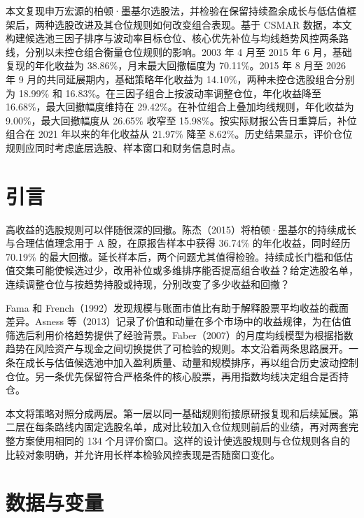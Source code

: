 \begin{cnabstract}
本文复现申万宏源的柏顿·墨基尔选股法，并检验在保留持续盈余成长与低估值框架后，两种选股改进及其仓位规则如何改变组合表现。基于 CSMAR 数据，本文构建候选池三因子排序与波动率目标仓位、核心优先补位与均线趋势风控两条路线，分别以未控仓组合衡量仓位规则的影响。2003 年 4 月至 2015 年 6 月，基础复现的年化收益为 38.86\%，月末最大回撤幅度为 70.11\%。2015 年 8 月至 2026 年 9 月的共同延展期内，基础策略年化收益为 14.10\%，两种未控仓选股组合分别为 18.99\% 和 16.83\%。在三因子组合上按波动率调整仓位，年化收益降至 16.68\%，最大回撤幅度维持在 29.42\%。在补位组合上叠加均线规则，年化收益为 9.00\%，最大回撤幅度从 26.65\% 收窄至 15.98\%。按实际财报公告日重算后，补位组合在 2021 年以来的年化收益从 21.97\% 降至 8.62\%。历史结果显示，评价仓位规则应同时考虑底层选股、样本窗口和财务信息时点。
\end{cnabstract}

\section{引言}

高收益的选股规则可以伴随很深的回撤。陈杰（2015）将柏顿·墨基尔的持续成长与合理估值理念用于 A 股，在原报告样本中获得 36.74\% 的年化收益，同时经历 70.19\% 的最大回撤\cite{chen2015}。延长样本后，两个问题尤其值得检验。持续成长门槛和低估值交集可能使候选过少，改用补位或多维排序能否提高组合收益？给定选股名单，连续调整仓位与按趋势持股或持现，分别改变了多少收益和回撤？

Fama 和 French（1992）发现规模与账面市值比有助于解释股票平均收益的截面差异\cite{ff1992}。Asness 等（2013）记录了价值和动量在多个市场中的收益规律，为在估值筛选后利用价格趋势提供了经验背景\cite{amp2013}。Faber（2007）的月度均线模型为根据指数趋势在风险资产与现金之间切换提供了可检验的规则\cite{faber2007}。本文沿着两条思路展开。一条在成长与估值候选池中加入盈利质量、动量和规模排序，再以组合历史波动控制仓位。另一条优先保留符合严格条件的核心股票，再用指数均线决定组合是否持仓。

本文将策略对照分成两层。第一层以同一基础规则衔接原研报复现和后续延展。第二层在每条路线内固定选股名单，成对比较加入仓位规则前后的业绩，再对两套完整方案使用相同的 134 个月评价窗口。这样的设计使选股规则与仓位规则各自的比较对象明确，并允许用长样本检验风控表现是否随窗口变化。

\section{数据与变量}

